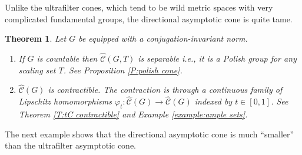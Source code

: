\documentclass[12pt]{amsart}
\newtheorem{theorem}[prop]{Theorem}
\theoremstyle{definition}
\newcommand{\OP}[1]{\operatorname{#1}}
\def\tC{\hat{\mathcal{C}}}
\begin{document}
Unlike the ultrafilter cones, which tend to be wild metric spaces with very complicated fundamental groups, the directional asymptotic cone is quite tame.




\begin{theorem}
Let $G$ be equipped with a conjugation-invariant norm.
\begin{enumerate}[label=(\alph*)]
\item
If $G$ is countable then $\tC(G,T)$ is separable i.e., it is a Polish group for any scaling set $T$. See Proposition \ref{P:polish cone}.

\item
$\tC(G)$ is contractible.
The contraction is through a continuous family of Lipschitz homomorphisms $\varphi_t \colon \tC(G) \to \tC(G)$ indexed by $t \in [0,1]$.
See Theorem \ref{T:tC contractible} and Example \ref{example:ample sets}.
\end{enumerate}
\end{theorem}


The next example shows that the directional asymptotic cone is much ``smaller'' than the ultrafilter asymptotic cone.
\end{document}
